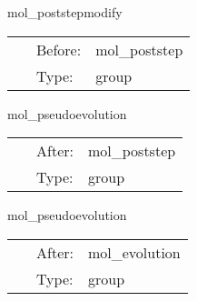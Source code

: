 \vspace{5mm}


\hspace{5mm} mol\_poststepmodify 

\hspace{5mm}{\it the group for physics thorns to schedule enforcing constraints } 


\hspace{5mm}

 \begin{tabular*}{160mm}{cll} 
~ & Before:  & mol\_poststep \\ 
~ & Type:  & group \\ 
\end{tabular*} 


\vspace{5mm}


\hspace{5mm} mol\_pseudoevolution 

\hspace{5mm}{\it calculate pseudo-evolved quantities } 


\hspace{5mm}

 \begin{tabular*}{160mm}{cll} 
~ & After:  & mol\_poststep \\ 
~ & Type:  & group \\ 
\end{tabular*} 


\vspace{5mm}


\hspace{5mm} mol\_pseudoevolution 

\hspace{5mm}{\it calculate pseudo-evolved quantities } 


\hspace{5mm}

 \begin{tabular*}{160mm}{cll} 
~ & After:  & mol\_evolution \\ 
~ & Type:  & group \\ 
\end{tabular*} 


\vspace{5mm}


